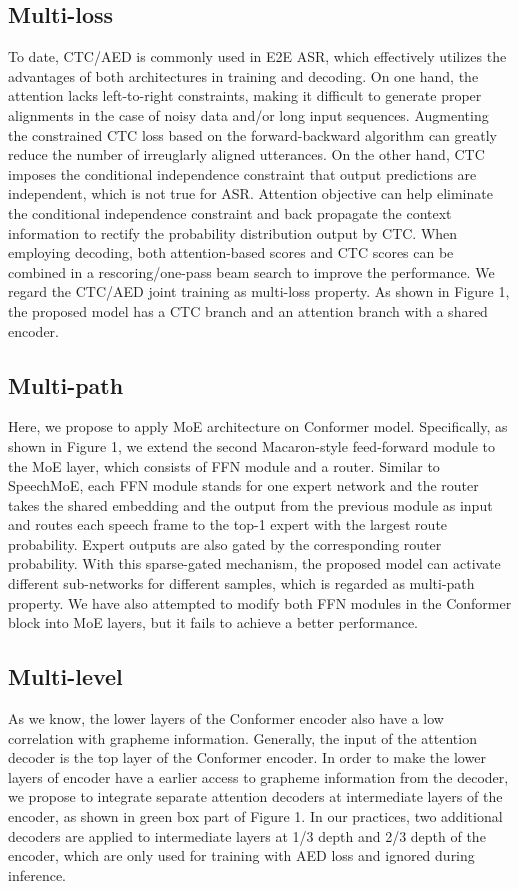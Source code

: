 \documentclass[a4paper]{article}
\begin{document}
\subsection{Multi-loss}
To date, CTC/AED is commonly used in E2E ASR, which effectively utilizes the
advantages of both architectures in training and decoding. On one hand, the attention lacks left-to-right constraints, making it difficult to generate proper alignments in the case of noisy data and/or long input sequences. Augmenting the constrained CTC loss based on the forward-backward algorithm can greatly reduce the number of irreuglarly aligned utterances. On the other hand, CTC imposes the conditional independence constraint that output predictions are independent, which is not true for ASR. Attention objective can help eliminate the conditional independence constraint and back propagate the context information to rectify the probability distribution output by CTC.
When employing decoding, both attention-based scores and CTC scores can be combined in a rescoring/one-pass beam search to improve the performance. We regard the CTC/AED joint training as multi-loss property. As shown in Figure 1, the proposed model has a CTC branch and an attention branch with a shared encoder.

\subsection{Multi-path}
Here, we propose to apply MoE architecture on Conformer model. Specifically, as shown in Figure 1, we extend the second Macaron-style feed-forward module to the MoE layer, which consists of  FFN module and a router. Similar to SpeechMoE\cite{you2021speechmoe}, each FFN module stands for one expert network and the router takes the shared embedding and the output from the previous module as input and routes each speech frame to the top-1 expert with the largest route probability. Expert outputs are also gated by the corresponding router probability. With this sparse-gated mechanism, the proposed model can activate different sub-networks for different samples, which is regarded as multi-path property. We have also attempted to modify both FFN modules in the Conformer block into MoE layers, but it fails to achieve a better performance.



\subsection{Multi-level}
As we know, the lower layers of the Conformer encoder also have a low  correlation with grapheme information. Generally, the input of the attention decoder is the top layer of the Conformer encoder. In order to make the lower layers of encoder have a earlier access to grapheme information from the decoder, we propose to integrate separate attention decoders at intermediate layers of the encoder, as shown in green box part of Figure 1. In our practices, two additional decoders are applied to intermediate layers at 1/3 depth and 2/3 depth of the encoder, which are only used for training with AED loss and ignored during inference.
\end{document}
